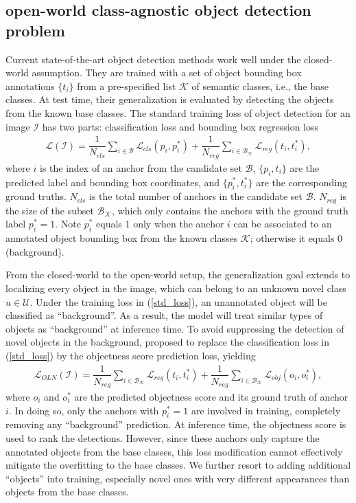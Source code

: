\documentclass{article} \usepackage{iclr2023_conference,times}
\begin{document}
\subsection{open-world class-agnostic object detection problem}
Current state-of-the-art object detection methods work well under the closed-world assumption. They are trained with a set of object bounding box annotations $\{t_i\}$ from a pre-specified list $\mathcal{K}$ of semantic classes, i.e., the base classes. At test time, their generalization is evaluated by detecting the objects from the known base classes. The standard training loss of object detection for an image $\mathcal{I}$ has two parts: classification loss and bounding box regression loss
\begin{align}
       \mathcal{L}(\mathcal{I}) = \dfrac{1}{N_{cls}}\sum_{i\in \mathcal{B}} \mathcal{L}_{cls}(p_i, p_i^*) + \dfrac{1}{N_{reg}} \sum_{i\in \mathcal{B}_{\mathcal{K}}} \mathcal{L}_{reg}(t_i, t_i^*),\label{std_loss}
\end{align}
where $i$ is the index of an anchor from the candidate set $\mathcal{B}$, $\{p_i, t_i\}$ are the predicted label and bounding box coordinates, and $\{p_i^*, t_i^*\}$ are the corresponding ground truths. $N_{cls}$ is the total number of anchors in the candidate set $\mathcal{B}$. $N_{reg}$ is the size of the subset $\mathcal{B}_{\mathcal{K}}$, which only contains the anchors with the ground truth label $p_i^*=1$. Note $p_i^*$ equals $1$ only when the anchor $i$ can be associated to an annotated object bounding box from the known classes $\mathcal{K}$; otherwise it equals $0$ (background). 

From the closed-world to the open-world setup, the generalization goal extends to localizing every object in the image, which can belong to an unknown novel class $u\in\mathcal{U}$. Under the training loss in (\ref{std_loss}), an unannotated object will be classified as ``background''. As a result, the model will treat similar types of objects as ``background'' at inference time. To avoid suppressing the detection of novel objects in the background, \citet{kim_learning_2021} proposed to replace the classification loss in (\ref{std_loss}) by the objectness score prediction loss, yielding
\begin{align}\label{eq:oln}
    \mathcal{L}_{OLN}(\mathcal{I})=\dfrac{1}{N_{reg}} \sum_{i\in \mathcal{B}_{\mathcal{K}}} \mathcal{L}_{reg}(t_i, t_i^*) +     \dfrac{1}{N_{reg}} \sum_{i\in \mathcal{B}_{\mathcal{K}}}\mathcal{L}_{obj}(o_i, o_i^*),
\end{align}
where $o_i$ and $o_i^*$ are the predicted objectness score and its ground truth of anchor $i$. In doing so, only the anchors with $p_i^*=1$ are involved in training, completely removing any ``background'' prediction. At inference time, the objectness score is used to rank the detections. However, since these anchors only capture the annotated objects from the base classes, this loss modification cannot effectively mitigate the overfitting to the base classes. We further resort to adding additional ``objects'' into training, especially novel ones with very different appearances than objects from the base classes.
\end{document}
